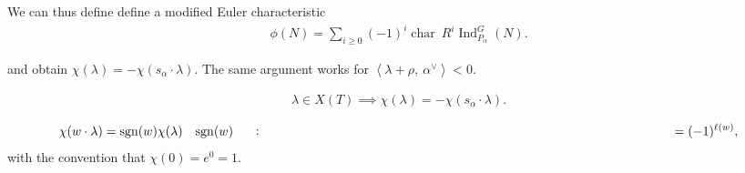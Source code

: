 We can thus define define a modified Euler characteristic
\begin{align*}   \phi(N) = \sum_{i\geq 0} (-1)^i \operatorname{char}~R^i \operatorname{Ind}_{P_\alpha}^G(N) .\end{align*}

and obtain \(\chi(\lambda) = -\chi(s_\alpha \cdot \lambda)\). The same
argument works for
\({\left\langle {\lambda + \rho},~{\alpha^\vee} \right\rangle} < 0\).

\begin{remark}

\begin{remark}

\begin{align*}   \lambda \in X(T) \implies \chi(\lambda) = -\chi(s_\alpha \cdot \lambda) .\end{align*}

\end{remark}

\end{remark}

\begin{proposition}

\begin{proposition}

\begin{align*}   \chi(w\cdot \lambda) = \operatorname{sgn}(w) \chi(\lambda) && \operatorname{sgn}(w) \mathrel{\vcenter{:}}=(-1)^{\ell(w)} ,\end{align*}
with the convention that \(\chi(0) = e^0 = 1\).

\end{proposition}

\end{proposition}

